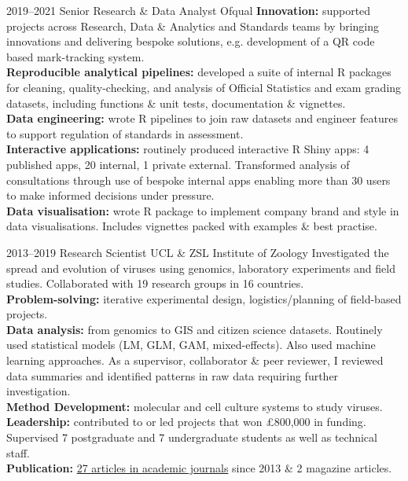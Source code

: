 \documentclass[]{friggeri-cv-a4}
\begin{document}
\begin{entrylist}


\entry
{2019--2021}
{Senior Research \& Data Analyst}
{Ofqual}
{%
\textbf{Innovation:} supported projects across Research, Data \& Analytics and Standards teams by bringing innovations and delivering bespoke solutions, e.g. development of a QR code based mark-tracking system. \\
\textbf{Reproducible analytical pipelines:} developed a suite of internal R packages for cleaning, quality-checking, and analysis of Official Statistics and exam grading datasets, including functions \& unit tests, documentation \& vignettes. \\
\textbf{Data engineering:} wrote R pipelines to join raw datasets and engineer features to support regulation of standards in assessment. \\
\textbf{Interactive applications:} routinely produced interactive R Shiny apps: 4 published apps, 20 internal, 1 private external. Transformed analysis of consultations through use of bespoke internal apps enabling more than 30 users to make informed decisions under pressure. \\
\textbf{Data visualisation:} wrote R package to implement company brand and style in data visualisations. Includes vignettes packed with examples \& best practise.%
}


\entry
{2013--2019}
{Research Scientist}
{UCL \& ZSL Institute of Zoology}
{Investigated the spread and evolution of viruses using genomics, laboratory experiments and field studies. Collaborated with 19 research groups in 16 countries. \\
\textbf{Problem-solving:} iterative experimental design, logistics/planning of field-based projects. \\
\textbf{Data analysis:} from genomics to GIS and citizen science datasets. Routinely used statistical models (LM, GLM, GAM, mixed-effects). Also used machine learning approaches. As a supervisor, collaborator \& peer reviewer, I reviewed data summaries and identified patterns in raw data requiring further investigation. \\
\textbf{Method Development:} molecular and cell culture systems to study viruses. \\
\textbf{Leadership:} contributed to or led projects that won £800,000 in funding. Supervised 7 postgraduate and 7 undergraduate students as well as technical staff. \\
\textbf{Publication:} \href{https://2infectious.wordpress.com/publications}{27 articles in academic journals} since 2013 \& 2 magazine articles.}


\end{entrylist}
\end{document}
